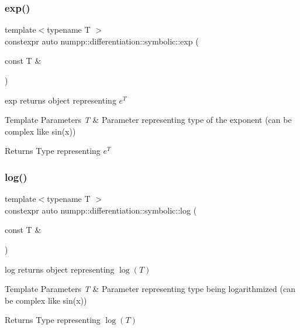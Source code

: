 \subsubsection{\texorpdfstring{exp()}{exp()}}
{\footnotesize\ttfamily template$<$typename T $>$ \\
constexpr auto numpp\+::differentiation\+::symbolic\+::exp (\begin{DoxyParamCaption}\item[{const T \&}]{ }\end{DoxyParamCaption})}

exp returns object representing $ e^T $ 
\begin{DoxyTemplParams}{Template Parameters}
{\em T} & Parameter representing type of the exponent (can be complex like sin(x))\\
\hline
\end{DoxyTemplParams}
\begin{DoxyReturn}{Returns}
Type representing $ e^T $
\end{DoxyReturn}
\mbox{\label{group__numpp__differentiation__symbolic_ga186ca63e28a816d1cb9c8175c7839468}} 
\subsubsection{\texorpdfstring{log()}{log()}}
{\footnotesize\ttfamily template$<$typename T $>$ \\
constexpr auto numpp\+::differentiation\+::symbolic\+::log (\begin{DoxyParamCaption}\item[{const T \&}]{ }\end{DoxyParamCaption})}

log returns object representing $ \log(T) $ 
\begin{DoxyTemplParams}{Template Parameters}
{\em T} & Parameter representing type being logarithmized (can be complex like sin(x))\\
\hline
\end{DoxyTemplParams}
\begin{DoxyReturn}{Returns}
Type representing $ \log(T) $
\end{DoxyReturn}
\mbox{\label{group__numpp__differentiation__symbolic_ga0f6f3d22e3e712ce154f7f6c91e0cf46}} 
